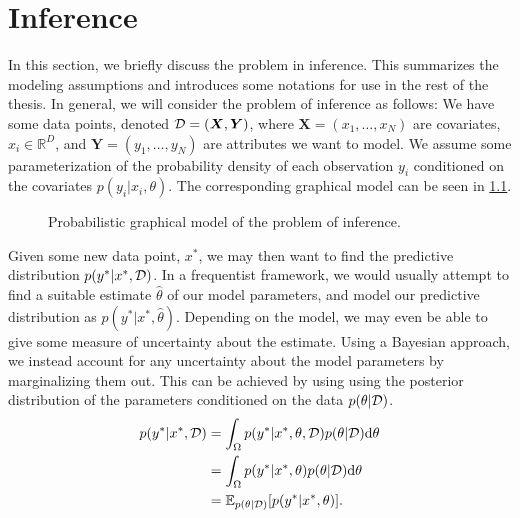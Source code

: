 \chapter{Inference}

In this section, we briefly discuss the problem in inference.
This summarizes the modeling assumptions and introduces some notations for use in the rest of the thesis. 
In general, we will consider the problem of inference as follows:
We have some data points, denoted $\mathcal{D} = (\bm{X}, \bm{Y})$, where $\bm{X} = (x_1,\dots,x_N)$ are covariates, $x_i\in \mathbb{R}^D$, and $\bm{Y} = (y_1, \dots, y_N)$ are attributes we want to model. 
We assume some parameterization of the probability density of each observation $y_i$ conditioned on the covariates $p(y_i|x_i,\theta)$.
The corresponding graphical model can be seen in \cref{fig:pgm}. 
\begin{figure}[htbp]
    \centering
    \caption{Probabilistic graphical model of the problem of inference.}
    \label{fig:pgm}
\end{figure}
Given some new data point, $x^\ast$, we may then want to find the predictive distribution $p(y^\ast | x^\ast, \mathcal{D})$. 
In a frequentist framework, we would usually attempt to find a suitable estimate $\hat{\theta}$ of our model parameters, and model our predictive distribution as $p(y^\ast | x^\ast, \hat{\theta})$.
Depending on the model, we may even be able to give some measure of uncertainty about the estimate.
Using a Bayesian approach, we instead account for any uncertainty about the model parameters by marginalizing them out. 
This can be achieved by using using the posterior distribution of the parameters conditioned on the data $p(\theta|\mathcal{D})$.
\begin{align}\label{eq:inference}
        p(y^\ast | x^\ast, \mathcal{D}) &= \int_{\Omega} p(y^\ast | x^\ast, \theta, \mathcal{D})  p(\theta|\mathcal{D}) \dd\theta \\
        &= \int_{\Omega} p(y^\ast | x^\ast, \theta)  p(\theta|\mathcal{D}) \dd\theta\\
        &= \operatorname{\mathbb{E}}_{p(\theta|\mathcal{D})} [p(y^\ast | x^\ast, \theta)]. 
\end{align}
